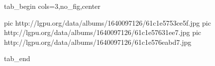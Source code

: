  
 
 
 
 


\ifcmt
  tab_begin cols=3,no_fig,center

     pic http://lgpu.org/data/albums/1640097126/61c1e5753ce5f.jpg
		 pic http://lgpu.org/data/albums/1640097126/61c1e57631ee7.jpg
		 pic http://lgpu.org/data/albums/1640097126/61c1e576eabd7.jpg

  tab_end
\fi
